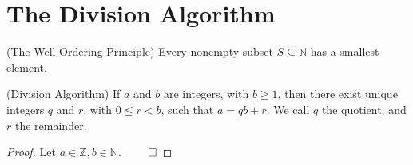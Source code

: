 \newpage

\section{The Division Algorithm} 

\begin{axiom}{(The Well Ordering Principle)}
Every nonempty subset $S \subseteq \mathbb{N}$ has a smallest element.
\end{axiom}

\begin{theorem}{(Division Algorithm)}
If $a$ and $b$ are integers, with $b \geq 1$, then there exist unique integers $q$ and $r$, with $0 \le r < b$, such that $a = qb + r$. 
We call $q$ the quotient, and $r$ the remainder.
\end{theorem}

\begin{proof}
Let $a \in \mathbb{Z}, b \in \mathbb{N}.$
 $\qed$
\end{proof}